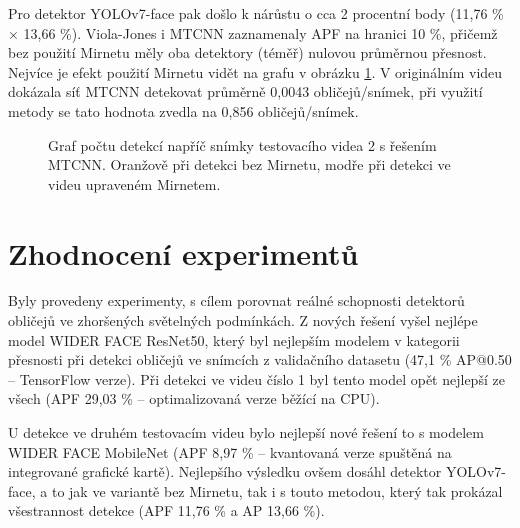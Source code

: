 Pro detektor YOLOv7-face pak došlo k nárůstu o cca 2 procentní body (11,76 \% $\times$ 13,66 \%). Viola-Jones i MTCNN zaznamenaly APF na hranici 10 \%, přičemž bez použití Mirnetu měly oba detektory (téměř) nulovou průměrnou přesnost. Nejvíce je efekt použití Mirnetu vidět na grafu v obrázku \ref{obrazek:mtcnnmirnet}. V originálním videu dokázala síť MTCNN detekovat průměrně 0,0043 obličejů/snímek, při využití metody se tato hodnota zvedla na 0,856 obličejů/snímek.

\begin{figure}[H] 
  \begin{center}
  \label{obrazek:mtcnnmirnet}
  \caption{Graf počtu detekcí napříč snímky testovacího videa 2 s řešením MTCNN. Oranžově při detekci bez Mirnetu, modře při detekci ve videu upraveném Mirnetem.}
  \end{center}
\end{figure}


\section{Zhodnocení experimentů}
\label{sekce:shnutiexperimentu}

Byly provedeny experimenty, s cílem porovnat reálné schopnosti detektorů obličejů ve zhoršených světelných podmínkách. Z nových řešení vyšel nejlépe model WIDER FACE ResNet50, který byl nejlepším modelem v kategorii přesnosti při detekci obličejů ve snímcích z validačního datasetu (47,1 \% AP@0.50 -- TensorFlow verze). Při detekci ve videu číslo 1 byl tento model opět nejlepší ze všech (APF 29,03 \% -- optimalizovaná verze běžící na CPU).

U detekce ve druhém testovacím videu bylo nejlepší nové řešení to s modelem WIDER FACE MobileNet (APF 8,97 \% -- kvantovaná verze spuštěná na integrované grafické kartě). Nejlepšího výsledku ovšem dosáhl detektor YOLOv7-face, a to jak ve variantě bez Mirnetu, tak i s touto metodou, který tak prokázal všestrannost detekce (APF 11,76 \% a AP 13,66 \%).

